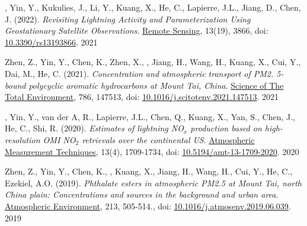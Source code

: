 \begin{cvpublications}
\publication
{, Yin, Y., Kukulies, J., Li, Y., Kuang, X.,
He, C., Lapierre, J.L., Jiang, D., Chen, J. (2022).
\emph{Revisiting Lightning Activity and Parameterization Using
Geostationary Satellite Observations}.
\underline{Remote Sensing}, 13(19), 3866,
doi: \href{https://doi.org/10.3390/rs13193866}{10.3390/rs13193866}.} %
{2021} %


\publication
{Zhen, Z., Yin, Y., Chen, K., Zhen, X., ,
Jiang, H., Wang, H., Kuang, X., Cui, Y., Dai, M., He, C. (2021).
\emph{Concentration and atmospheric transport of PM2. 5-bound polycyclic aromatic hydrocarbons at Mount Tai, China}.
\underline{Science of The Total Environment}, 786, 147513,
doi: \href{https://doi.org/10.1016/j.scitotenv.2021.147513}{10.1016/j.scitotenv.2021.147513}.} %
{2021} %

\publication
{, Yin, Y., van der A, R., Lapierre, J.L.,
Chen, Q., Kuang, X., Yan, S., Chen, J., He, C., Shi, R. (2020).
\emph{Estimates of lightning NO$_x$ production based on high-resolution OMI NO$_2$ retrievals over the continental US}.
\underline{Atmospheric Measurement Techniques}, 13(4), 1709-1734,
doi: \href{https://doi.org/10.5194/amt-13-1709-2020}{10.5194/amt-13-1709-2020}.} %
{2020} %

\publication
{Zhen, Z., Yin, Y., Chen, K., ,
Kuang, X., Jiang, H., Wang, H., Cui, Y., He, C., Ezekiel, A.O. (2019).
\emph{Phthalate esters in atmospheric PM2.5 at Mount Tai, north China plain:
Concentrations and sources in the background and urban area}.
\underline{Atmospheric Environment},
213, 505-514.,
doi: \href{https://doi.org/10.1016/j.atmosenv.2019.06.039}{10.1016/j.atmosenv.2019.06.039}.} %
{2019} %


\end{cvpublications}
